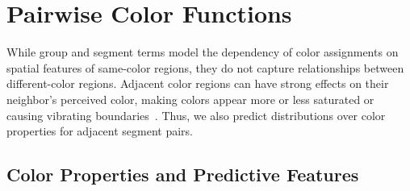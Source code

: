 \section{Pairwise Color Functions}
\label{sec:binary}

While group and segment terms model the dependency of color assignments on spatial features of same-color regions, they do not capture relationships between different-color regions. Adjacent color regions can have strong effects on their neighbor's perceived color, making colors appear more or less saturated or causing vibrating boundaries~\cite{AlbersInteractionOfColor}. Thus, we also predict distributions over color properties for adjacent segment pairs.


\subsection{Color Properties and Predictive Features}
\label{sec:binaryPropsAndFeatures}

